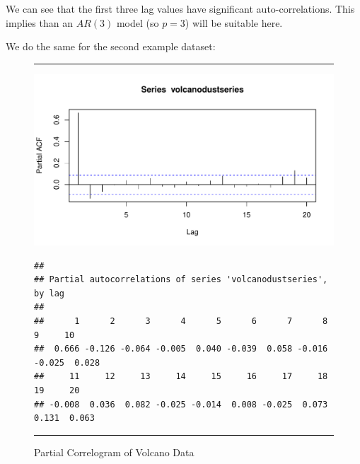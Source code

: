 \documentclass[11pt, letterpaper, twoside]{memoir}\usepackage{knitr}
\begin{document}
We can see that the first three lag values have significant auto-correlations. This implies than an $AR(3)$ model (so $p = 3$) will be suitable here.

We do the same for the second example dataset:

\begin{figure}
\centering
\rule{4in}{1pt}
\begin{knitrout}
\color{fgcolor}\begin{kframe}
\begin{alltt}
 \hlstd{=}\hlstd{)}
\end{alltt}
\end{kframe}
\includegraphics[width=\maxwidth]{figure/unnamed-chunk-125-1} 
\begin{kframe}\begin{alltt}
 \hlstd{=}\hlstd{,} \hlstd{=}\hlstd{)}
\end{alltt}
\begin{verbatim}
## 
## Partial autocorrelations of series 'volcanodustseries', by lag
## 
##      1      2      3      4      5      6      7      8      9     10 
##  0.666 -0.126 -0.064 -0.005  0.040 -0.039  0.058 -0.016 -0.025  0.028 
##     11     12     13     14     15     16     17     18     19     20 
## -0.008  0.036  0.082 -0.025 -0.014  0.008 -0.025  0.073  0.131  0.063
\end{verbatim}
\end{kframe}
\end{knitrout}
\caption{Partial Correlogram of Volcano Data}
\label{Fig:parcorvol}
\rule{4in}{1pt}
\end{figure}
\end{document}
